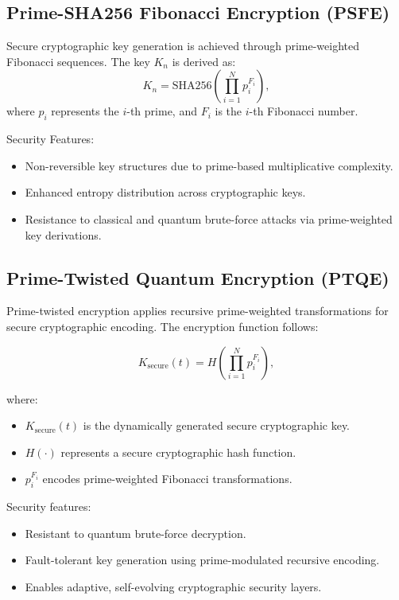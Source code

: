 \documentclass{article}
\theoremstyle{plain}
\begin{document}
\begin{itemize}
\begin{itemize}
\subsection{Prime-SHA256 Fibonacci Encryption (PSFE)}

Secure cryptographic key generation is achieved through prime-weighted Fibonacci sequences. The key $K_n$ is derived as:
\begin{equation}
K_n = \text{SHA256} \left( \prod_{i=1}^{N} p_i^{F_i} \right),
\end{equation}
where $p_i$ represents the $i$-th prime, and $F_i$ is the $i$-th Fibonacci number. 

Security Features:
\begin{itemize}
    \item Non-reversible key structures due to prime-based multiplicative complexity.
    \item Enhanced entropy distribution across cryptographic keys.
    \item Resistance to classical and quantum brute-force attacks via prime-weighted key derivations.
\end{itemize}

\subsection{Prime-Twisted Quantum Encryption (PTQE)}

Prime-twisted encryption applies recursive prime-weighted transformations for secure cryptographic encoding. The encryption function follows:

\begin{equation}
K_{\text{secure}}(t) = H \left(\prod_{i=1}^{N} p_i^{F_i} \right),
\end{equation}

where:
\begin{itemize}
    \item $K_{\text{secure}}(t)$ is the dynamically generated secure cryptographic key.
    \item $H(\cdot)$ represents a secure cryptographic hash function.
    \item $p_i^{F_i}$ encodes prime-weighted Fibonacci transformations.
\end{itemize}
Security features:
\begin{itemize}
    \item Resistant to quantum brute-force decryption.
    \item Fault-tolerant key generation using prime-modulated recursive encoding.
    \item Enables adaptive, self-evolving cryptographic security layers.
\end{itemize}


\end{itemize}
\end{itemize}
\end{document}
